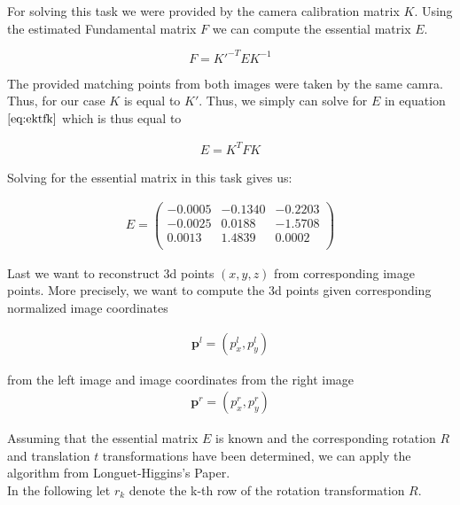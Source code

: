 \documentclass{paper}
\begin{document}
For solving this task we were provided by the camera calibration matrix $K$.  
Using the estimated Fundamental matrix $F$ we can compute the essential matrix $E$.

\begin{equation}
    F = K'^{-T} E K^{-1}
\label{eq:ektfk}
\end{equation}

The provided matching points from both images were taken by the same camra. Thus, for our case $K$ is equal to $K'$. Thus, we simply can solve for $E$ in equation $\ref{eq:ektfk}$ which is thus equal to

\begin{align}
    E = K^{T} F K
\end{align}

Solving for the essential matrix in this task gives us:

\begin{align}
E = 
\left(\begin{array}{rrr}
   -0.0005  & -0.1340 &  -0.2203 \\
   -0.0025  &  0.0188 &  -1.5708 \\
    0.0013  &  1.4839 &   0.0002 \\
\end{array} \right)
\end{align}




Last we want to reconstruct 3d points $(x,y,z)$ from corresponding image points. More precisely, we want to compute the 3d points given corresponding normalized image coordinates 

\begin{align}
    \textbf{p}^{l} = (p^{l}_{x}, p^{l}_{y})
\end{align}

from the left image and image coordinates from the right image
\begin{align}
    \textbf{p}^{r} = (p^{r}_{x}, p^{r}_{y})
\end{align}

Assuming that the essential matrix $E$ is known and the corresponding rotation $R$ and translation $t$ transformations have been determined, we can apply the algorithm from Longuet-Higgins's Paper. \\

In the following let $r_k$ denote the k-th row of the rotation transformation $R$.
\end{document}

